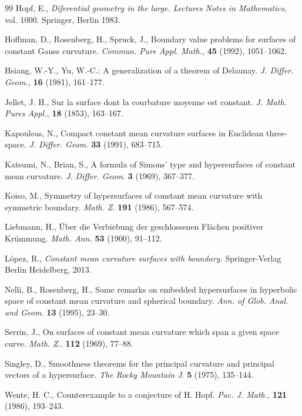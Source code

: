 \documentclass[11pt]{amsart}
\theoremstyle{plain}
\numberwithin{equation}{section}
\numberwithin{theorem}{section}
\begin{document}
\begin{thebibliography}{99}
Hopf, E., \emph{Diferential geometry in the large. Lectures Notes in Mathematics}, vol. 1000. Springer, Berlin 1983.

Hoffman, D., Rosenberg, H., Spruck, J., Boundary value problems for surfaces of constant Gauss curvature.
\emph{Commun. Pure Appl. Math.,} \textbf{45} (1992), 1051--1062.

Hsiang, W.-Y., Yu, W.-C.: A generalization of a theorem of Delaunay.
\emph{J. Differ. Geom.,} \textbf{16} (1981), 161--177.


Jellet, J. H., Sur la surface dont la courbature moyenne est constant.
\emph{J. Math. Pures Appl.,} \textbf{18} (1853), 163--167.

Kapouleas, N., Compact constant mean curvature surfaces in Euclidean three-space. 
\emph{J. Differ. Geom.} \textbf{33} (1991), 683--715.

Katsumi, N., Brian, S., A formula of Simons' type and hypersurfaces of constant mean curvature. 
\emph{J. Differ. Geom.} \textbf{3} (1969), 367--377.

Koiso, M., Symmetry of hypersurfaces of constant mean curvature with symmetric boundary.
\emph{Math. Z.} \textbf{191} (1986), 567--574.

Liebmann, H., Über die Verbiebung der geschlossenen Flächen positiver Krümmung.
\emph{Math. Ann.}  \textbf{53} (1900), 91--112.

L\'opez, R., \emph{Constant mean curvature surfaces with boundary.} Springer-Verlag Berlin Heidelberg, 2013.

Nelli, B., Rosenberg, H., Some remarks on embedded hypersurfaces in hyperbolic space of constant mean curvature and spherical boundary. \emph{Ann. of Glob. Anal. and Geom.}
\textbf{13} (1995), 23--30.

Serrin, J., On surfaces of constant mean curvature which span a given space curve.
\emph{Math. Z.}. \textbf{112} (1969), 77--88.

Singley, D., Smoothness theorems for the principal curvature and principal vectors of a hypersurface.
\emph{The Rocky Mountain J}. \textbf{5} (1975), 135--144.

Wente, H. C.,  Counterexample to a conjecture of H. Hopf.
\emph{Pac. J. Math.,} \textbf{121} (1986), 193--243.

\end{thebibliography}
\end{document}
